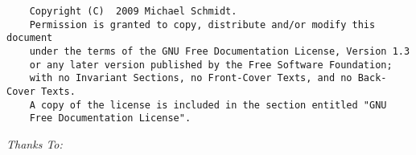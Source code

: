 
\begin{center}
\begin{verbatim}
	Copyright (C)  2009 Michael Schmidt.
	Permission is granted to copy, distribute and/or modify this document
	under the terms of the GNU Free Documentation License, Version 1.3
	or any later version published by the Free Software Foundation;
	with no Invariant Sections, no Front-Cover Texts, and no Back-Cover Texts.
	A copy of the license is included in the section entitled "GNU
	Free Documentation License".
\end{verbatim}
\end{center}


\begin{center}
	\emph{Thanks To:}
\end{center}

